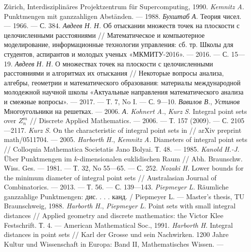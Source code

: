 \begin{thebibliography}{99}
Zürich, Interdisziplinäres Projektzentrum für Supercomputing,
1990.
\textsl{Kemnitz} \textsl{A.} Punktmengen mit ganzzahligen
Abständen. — 1988.
\textsl{Бухштаб} \textsl{А.} Теория чисел. — 1966. — С. 384.
\textsl{Авдеев} \textsl{Н. Н.} Об отыскании множеств точек на
плоскости с целочисленными расстояниями // Математическое
и компьютерное моделирование, информационные технологии
управления: сб. тр. Школы для студентов, аспирантов и
молодых ученых «МКМИТУ-2016». — 2016. — С. 15—19.
\textsl{Авдеев} \textsl{Н. Н.} О множествах точек на
плоскости с целочисленными расстояниями и алгоритмах их
отыскания // Некоторые вопросы анализа, алгебры, геометрии
и математического образования: материалы международной
молодежной научной школы «Актуальные направления
математического анализа и смежные вопросы». — 2017. — Т. 7,
No I. — С. 9—10.
\textsl{Вавилов} \textsl{В.}, \textsl{Устинов}
Многоугольники на решетках. — 2006.
\textsl{А.}
\textsl{Kohnert} \textsl{A.}, \textsl{Kurz} \textsl{S.} Integral
point sets over $Z^m_n$
// Discrete Applied Mathematics. — 2006. —
Т. 157 (2009). — С. 2105—2117.
\textsl{Kurz} \textsl{S.} On the characteristic of integral point
sets in // arXiv preprint math/0511704. — 2005.
\textsl{Harborth} \textsl{H.}, \textsl{Kemnitz} \textsl{A.}
Diameters of integral point sets // Colloquia Mathematica
Societatis Jano Bolyai. Т. 48. — 1985.
\textsl{Kanold}
\textsl{H.-J.}
Über
Punktmengen
im
$k$-dimensionalen euklidischen Raum // Abh. Braunschw. Wiss.
Ges. — 1981. — Т. 32, No 55—65. — С. 252.
\textsl{Nozaki} \textsl{H.} Lower bounds for the minimum
diameter of integral point sets // Australasian Journal of
Combinatorics. — 2013. — Т. 56. — С. 139—143.
\textsl{Piepmeyer}
\textsl{L.}
Räumliche
ganzzahlige
Punktmengen: дис. . . . канд. / Piepmeyer L. — Master’s
thesis, TU Braunschweig, 1988.
\textsl{Harborth} \textsl{H.}, \textsl{Piepmeyer} \textsl{L.}
Point sets with small integral distances // Applied geometry and
discrete mathematics: the Victor Klee Festschrift. Т. 4. — American
Mathematical Soc., 1991.
\textsl{Harborth} \textsl{H.} Integral distances in point sets //
Karl der Grosse und sein Nachwirken. 1200 Jahre Kultur und
Wissenschaft in Europa: Band II, Mathematisches Wissen. —

\end{thebibliography}
